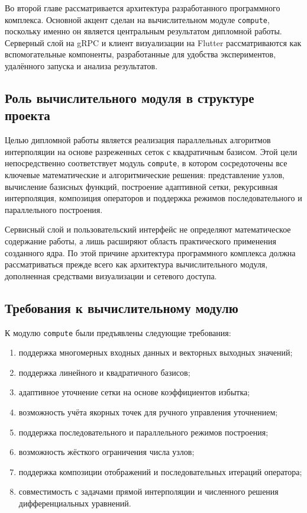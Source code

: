 Во второй главе рассматривается архитектура разработанного программного комплекса. Основной акцент сделан на вычислительном модуле \texttt{compute}, поскольку именно он является центральным результатом дипломной работы. Серверный слой на gRPC и клиент визуализации на Flutter рассматриваются как вспомогательные компоненты, разработанные для удобства экспериментов, удалённого запуска и анализа результатов.

\subsection{Роль вычислительного модуля в структуре проекта}

Целью дипломной работы является реализация параллельных алгоритмов интерполяции на основе разреженных сеток с квадратичным базисом. Этой цели непосредственно соответствует модуль \texttt{compute}, в котором сосредоточены все ключевые математические и алгоритмические решения: представление узлов, вычисление базисных функций, построение адаптивной сетки, рекурсивная интерполяция, композиция операторов и поддержка режимов последовательного и параллельного построения.

Сервисный слой и пользовательский интерфейс не определяют математическое содержание работы, а лишь расширяют область практического применения созданного ядра. По этой причине архитектура программного комплекса должна рассматриваться прежде всего как архитектура вычислительного модуля, дополненная средствами визуализации и сетевого доступа.

\subsection{Требования к вычислительному модулю}

К модулю \texttt{compute} были предъявлены следующие требования:
\begin{enumerate}
    \item поддержка многомерных входных данных и векторных выходных значений;
    \item поддержка линейного и квадратичного базисов;
    \item адаптивное уточнение сетки на основе коэффициентов избытка;
    \item возможность учёта якорных точек для ручного управления уточнением;
    \item поддержка последовательного и параллельного режимов построения;
    \item возможность жёсткого ограничения числа узлов;
    \item поддержка композиции отображений и последовательных итераций оператора;
    \item совместимость с задачами прямой интерполяции и численного решения дифференциальных уравнений.
\end{enumerate}

